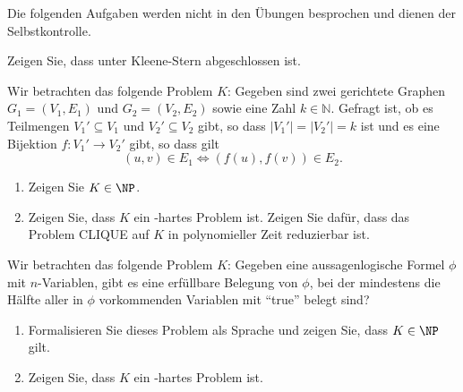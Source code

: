 \documentclass[german]{latteachCD}[2017/03/28]
\begin{document}
\maketitle

\begin{mdframed}
  Die folgenden Aufgaben werden nicht in den Übungen besprochen und dienen der
  Selbstkontrolle.

  \renewcommand{\theexercise}{\BoldGreek{exercise}}
  \setcounter{exercise}{1}

  \begin{exercise}
    Zeigen Sie, dass \NP{} unter Kleene-Stern abgeschlossen ist.
  \end{exercise}

  \begin{exercise}
    Wir betrachten das folgende Problem $K$: Gegeben sind zwei gerichtete
    Graphen $G_{1} = (V_{1}, E_{1})$ und $G_{2} = (V_{2}, E_{2})$ sowie eine
    Zahl $k \in \mathbb N$.  Gefragt ist, ob es Teilmengen $V_{1}' \subseteq
    V_{1}$ und $V_{2}' \subseteq V_{2}$ gibt, so dass $\lvert V_{1}'\rvert =
    \lvert V_{2}'\rvert = k$ ist und es eine Bijektion $f \colon V_{1}' \to
    V_{2}'$ gibt, so dass gilt
    \begin{equation*}
      (u,v) \in E_{1} \iff (f(u), f(v)) \in E_{2}.
    \end{equation*}
    \begin{enumerate}
    \item Zeigen Sie $K \in \NP$.
    \item Zeigen Sie, dass $K$ ein \NP-hartes Problem ist.  Zeigen Sie dafür,
      dass das Problem CLIQUE auf $K$ in polynomieller Zeit reduzierbar ist.
    \end{enumerate}
  \end{exercise}

\end{mdframed}

\vspace*{0.5\baselineskip}

\setcounter{exercise}{0}

\begin{exercise}
  Wir betrachten das folgende Problem $K$: Gegeben eine aussagenlogische
  Formel $\phi$ mit $n$-Variablen, gibt es eine erfüllbare Belegung von $\phi$,
  bei der mindestens die Hälfte aller in $\phi$ vorkommenden Variablen mit
  \enquote{true} belegt sind?
  \begin{enumerate}
  \item Formalisieren Sie dieses Problem als Sprache und zeigen Sie, dass $K \in
    \NP$ gilt.
  \item Zeigen Sie, dass $K$ ein \NP-hartes Problem ist.
  \end{enumerate}
\end{exercise}
\end{document}
